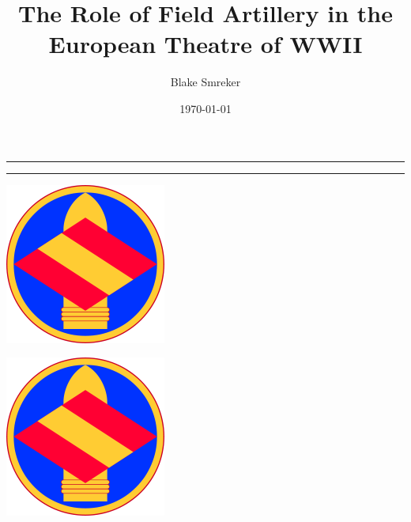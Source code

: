 \documentclass{article}
\title{The Role of Field Artillery in the European Theatre of WWII}
\author{Blake Smreker}
\date{\today}
\begin{document}
\maketitle											%
\vspace{-112px}										%
\noindent\rule{\linewidth}{1pt} \par				%
\vspace{100px}										%
\vspace{-20px}										%
\noindent\rule{\linewidth}{1pt} \par				%
\vspace{10px}										%
\vspace{-85px}										%
\noindent											%
\begin{minipage}{0.5\textwidth}\begin{flushleft}	%
\hspace{20px}										%
\includegraphics[scale = 0.06]{resources/142.png}		%
\end{flushleft}\end{minipage}						%
\begin{minipage}{0.5\textwidth}\begin{flushright}	%
\includegraphics[scale = 0.06]{resources/142.png}		%
\hspace*{20px}										%
\end{flushright}\end{minipage}						%
\vspace{20px}										%
\end{document}
